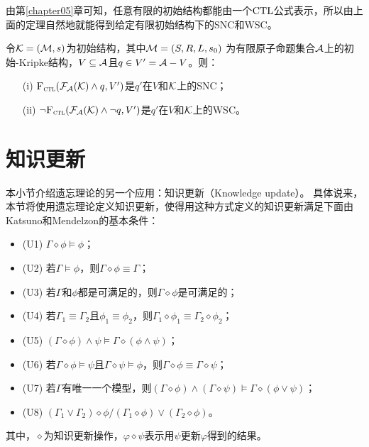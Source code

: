 由第\ref{chapter05}章可知，任意有限的初始结构都能由一个$\textrm{CTL}$公式表示，所以由上面的定理自然地就能得到给定有限初始结构下的SNC和WSC。
\begin{corollary}\label{thm:inK:SNC}
	令${\cal K}= ({\cal M}, s)$为初始结构，其中${\cal M}=(S,R,L,s_0)$ 为有限原子命题集合${\cal A}$上的初始-Kripke结构，$V \subseteq {\cal A}$且$q\in V' = {\cal A} - V$。则：
	\begin{itemize}
		\item[(i)] ${\textsc{F}_{\textsc{ctl}}}({\cal F}_{{\cal A}}({\cal K}) \wedge q, V')$是$q'$在$V$和${\cal K}$上的SNC；
		\item[(ii)] $\neg {\textsc{F}_{\textsc{ctl}}}({\cal F}_{{\cal A}}({\cal K}) \wedge \neg q, V')$是$q'$在$V$和${\cal K}$上的WSC。
	\end{itemize}
\end{corollary}

\section{知识更新}\label{chapter07:sec:update}
本小节介绍遗忘理论的另一个应用：知识更新（Knowledge update）。
具体说来，本节将使用遗忘理论定义知识更新，使得用这种方式定义的知识更新满足下面由Katsuno和Mendelzon的基本条件：
\begin{itemize}
	\item (U1)  $\Gamma \diamond \phi \models \phi$；
	\item (U2) 若$\Gamma \models \phi$，则$\Gamma \diamond \phi \equiv \Gamma$；
	\item (U3) 若$\Gamma$和$\phi$都是可满足的，则$\Gamma \diamond \phi$是可满足的；
	\item (U4) 若$\Gamma_1\equiv \Gamma_2$且$\phi_1 \equiv \phi_2$，则$\Gamma_1 \diamond \phi_1 \equiv \Gamma_2 \diamond \phi_2$；
	\item (U5) $(\Gamma \diamond \phi) \wedge \psi \models \Gamma \diamond(\phi \wedge \psi)$；
	\item (U6) 若$\Gamma \diamond \phi \models \psi$且$\Gamma \diamond \psi \models \phi$，则$\Gamma \diamond \phi \equiv \Gamma \diamond \psi$；
	\item (U7) 若$\Gamma$有唯一一个模型，则$(\Gamma \diamond \phi) \wedge (\Gamma \diamond \psi) \models \Gamma \diamond (\phi \vee \psi)$；
	\item (U8) $(\Gamma_1 \vee \Gamma_2) \diamond \phi                                                                                                                    / (\Gamma_1 \diamond \phi) \vee  (\Gamma_2 \diamond \phi)$。
\end{itemize}
其中，$\diamond$为知识更新操作，$\varphi \diamond \psi$表示用$\psi$更新$\varphi$得到的结果。

